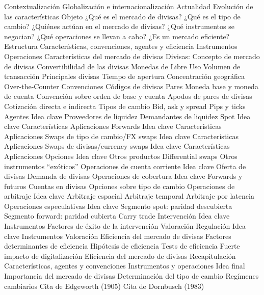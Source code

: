 \documentclass{nuevotema}
\begin{document}
\begin{esquema}[enumerate]
	\1[] 
		\2 Contextualización
			\3 Globalización e internacionalización
			\3 Actualidad
			\3 Evolución de las características
		\2 Objeto
			\3 ¿Qué es el mercado de divisas?
			\3 ¿Qué es el tipo de cambio?
			\3 ¿Quiénes actúan en el mercado de divisas?
			\3 ¿Qué instrumentos se negocian?
			\3 ¿Qué operaciones se llevan a cabo?
			\3 ¿Es un mercado eficiente?
		\2 Estructura
			\3 Características, convenciones, agentes y eficiencia
			\3 Instrumentos
			\3 Operaciones
	\1 
		\2 Características del mercado de divisas
			\3 Divisas:
			\3 Concepto de mercado de divisas
			\3 Convertibilidad de las divisas
			\3 Monedas de Libre Uso
			\3 Volumen de transacción
			\3 Principales divisas
			\3 Tiempo de apertura
			\3 Concentración geográfica
			\3 Over-the-Counter
		\2 Convenciones
			\3 Códigos de divisas
			\3 Pares
			\3 Moneda base y moneda de cuenta
			\3 Convención sobre orden de base y cuenta
			\3 Apodos de pares de divisas
			\3 Cotización directa e indirecta
			\3 Tipos de cambio
			\3 Bid, ask y spread
			\3 Pips y ticks
		\2 Agentes
			\3 Idea clave
			\3 Proveedores de liquidez
			\3 Demandantes de liquidez
	\1 
		\2 Spot
			\3 Idea clave
			\3 Características
			\3 Aplicaciones
		\2 Forwards
			\3 Idea clave
			\3 Características
			\3 Aplicaciones
		\2 Swaps de tipo de cambio/FX swaps
			\3 Idea clave
			\3 Características
			\3 Aplicaciones
		\2 Swaps de divisas/currency swaps
			\3 Idea clave
			\3 Características
			\3 Aplicaciones
		\2 Opciones
			\3 Idea clave
		\2 Otros productos
			\3 Differential swaps
			\3 Otros instrumentos ``exóticos''
	\1 
		\2 Operaciones de cuenta corriente
			\3 Idea clave
			\3 Oferta de divisas
			\3 Demanda de divisas
		\2 Operaciones de cobertura
			\3 Idea clave
			\3 Forwards y futuros
			\3 Cuentas en divisas
			\3 Opciones sobre tipo de cambio
		\2 Operaciones de arbitraje
			\3 Idea clave
			\3 Arbitraje espacial
			\3 Arbitraje temporal
			\3 Arbitraje por latencia
		\2 Operaciones especulativas
			\3 Idea clave
			\3 Segmento spot: paridad descubierta
			\3 Segmento forward: paridad cubierta
			\3 Carry trade
		\2 Intervención
			\3 Idea clave
			\3 Instrumentos
			\3 Factores de éxito de la intervención
			\3 Valoración
		\2 Regulación
			\3 Idea clave
			\3 Instrumentos
			\3 Valoración
	\1 
		\2 Eficiencia del mercado de divisas
			\3 Factores determinantes de eficiencia
			\3 Hipótesis de eficiencia
			\3 Tests de eficiencia
			\3 Fuerte impacto de digitalización
		\2 Eficiencia del mercado de divisas
	\1[] 
		\2 Recapitulación
			\3 Características, agentes y convenciones
			\3 Instrumentos y operaciones
		\2 Idea final
			\3 Importancia del mercado de divisas
			\3 Determinación del tipo de cambio
			\3 Regímenes cambiarios
			\3 Cita de Edgeworth (1905)
			\3 Cita de Dornbusch (1983)

\end{esquema}
\end{document}
